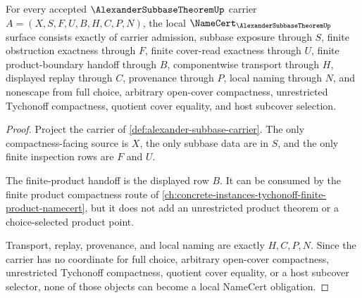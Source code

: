 \begin{theorem}
\label{thm:alexander-subbase-namecert-obligations}
For every accepted $\AlexanderSubbaseTheoremUp$ carrier $A=(X,S,F,U,B,H,C,P,N)$, the local $\NameCert_{\AlexanderSubbaseTheoremUp}$ surface consists exactly of carrier admission, subbase exposure through $S$, finite obstruction exactness through $F$, finite cover-read exactness through $U$, finite product-boundary handoff through $B$, componentwise transport through $H$, displayed replay through $C$, provenance through $P$, local naming through $N$, and nonescape from full choice, arbitrary open-cover compactness, unrestricted Tychonoff compactness, quotient cover equality, and host subcover selection.
\end{theorem}
\begin{proof}
Project the carrier of \autoref{def:alexander-subbase-carrier}. The only compactness-facing source is $X$, the only subbase data are in $S$, and the only finite inspection rows are $F$ and $U$.

The finite-product handoff is the displayed row $B$. It can be consumed by the finite product compactness route of \autoref{ch:concrete-instances-tychonoff-finite-product-namecert}, but it does not add an unrestricted product theorem or a choice-selected product point.

Transport, replay, provenance, and local naming are exactly $H,C,P,N$. Since the carrier has no coordinate for full choice, arbitrary open-cover compactness, unrestricted Tychonoff compactness, quotient cover equality, or a host subcover selector, none of those objects can become a local NameCert obligation.
\end{proof}

